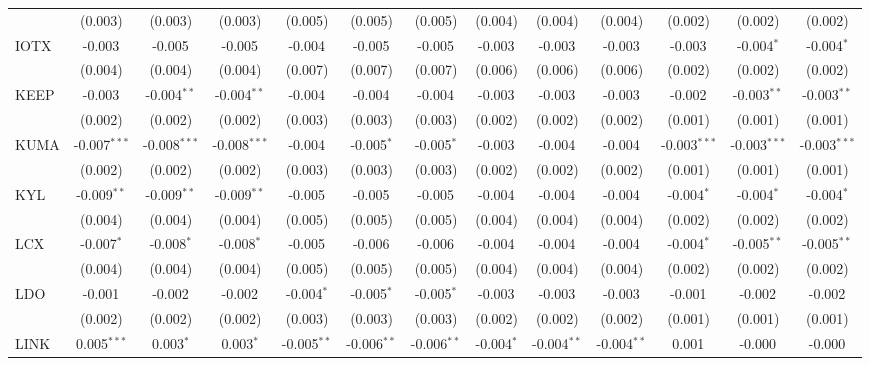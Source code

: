 \begin{table}[!htbp]
\begin{tabular}{@{\extracolsep{5pt}}lcccccccccccc}
  & (0.003) & (0.003) & (0.003) & (0.005) & (0.005) & (0.005) & (0.004) & (0.004) & (0.004) & (0.002) & (0.002) & (0.002) \\
 IOTX & -0.003$^{}$ & -0.005$^{}$ & -0.005$^{}$ & -0.004$^{}$ & -0.005$^{}$ & -0.005$^{}$ & -0.003$^{}$ & -0.003$^{}$ & -0.003$^{}$ & -0.003$^{}$ & -0.004$^{*}$ & -0.004$^{*}$ \\
  & (0.004) & (0.004) & (0.004) & (0.007) & (0.007) & (0.007) & (0.006) & (0.006) & (0.006) & (0.002) & (0.002) & (0.002) \\
 KEEP & -0.003$^{}$ & -0.004$^{**}$ & -0.004$^{**}$ & -0.004$^{}$ & -0.004$^{}$ & -0.004$^{}$ & -0.003$^{}$ & -0.003$^{}$ & -0.003$^{}$ & -0.002$^{}$ & -0.003$^{**}$ & -0.003$^{**}$ \\
  & (0.002) & (0.002) & (0.002) & (0.003) & (0.003) & (0.003) & (0.002) & (0.002) & (0.002) & (0.001) & (0.001) & (0.001) \\
 KUMA & -0.007$^{***}$ & -0.008$^{***}$ & -0.008$^{***}$ & -0.004$^{}$ & -0.005$^{*}$ & -0.005$^{*}$ & -0.003$^{}$ & -0.004$^{}$ & -0.004$^{}$ & -0.003$^{***}$ & -0.003$^{***}$ & -0.003$^{***}$ \\
  & (0.002) & (0.002) & (0.002) & (0.003) & (0.003) & (0.003) & (0.002) & (0.002) & (0.002) & (0.001) & (0.001) & (0.001) \\
 KYL & -0.009$^{**}$ & -0.009$^{**}$ & -0.009$^{**}$ & -0.005$^{}$ & -0.005$^{}$ & -0.005$^{}$ & -0.004$^{}$ & -0.004$^{}$ & -0.004$^{}$ & -0.004$^{*}$ & -0.004$^{*}$ & -0.004$^{*}$ \\
  & (0.004) & (0.004) & (0.004) & (0.005) & (0.005) & (0.005) & (0.004) & (0.004) & (0.004) & (0.002) & (0.002) & (0.002) \\
 LCX & -0.007$^{*}$ & -0.008$^{*}$ & -0.008$^{*}$ & -0.005$^{}$ & -0.006$^{}$ & -0.006$^{}$ & -0.004$^{}$ & -0.004$^{}$ & -0.004$^{}$ & -0.004$^{*}$ & -0.005$^{**}$ & -0.005$^{**}$ \\
  & (0.004) & (0.004) & (0.004) & (0.005) & (0.005) & (0.005) & (0.004) & (0.004) & (0.004) & (0.002) & (0.002) & (0.002) \\
 LDO & -0.001$^{}$ & -0.002$^{}$ & -0.002$^{}$ & -0.004$^{*}$ & -0.005$^{*}$ & -0.005$^{*}$ & -0.003$^{}$ & -0.003$^{}$ & -0.003$^{}$ & -0.001$^{}$ & -0.002$^{}$ & -0.002$^{}$ \\
  & (0.002) & (0.002) & (0.002) & (0.003) & (0.003) & (0.003) & (0.002) & (0.002) & (0.002) & (0.001) & (0.001) & (0.001) \\
 LINK & 0.005$^{***}$ & 0.003$^{*}$ & 0.003$^{*}$ & -0.005$^{**}$ & -0.006$^{**}$ & -0.006$^{**}$ & -0.004$^{*}$ & -0.004$^{**}$ & -0.004$^{**}$ & 0.001$^{}$ & -0.000$^{}$ & -0.000$^{}$ \\

\end{tabular}
\end{table}

